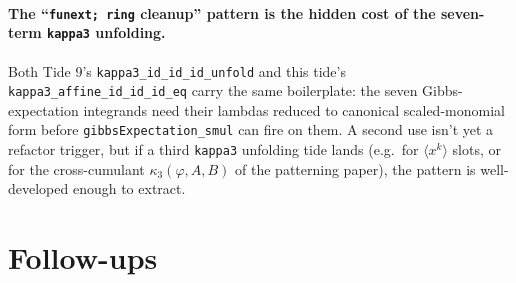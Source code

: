 \documentclass[11pt]{article}
\begin{document}
\paragraph{The ``\texttt{funext;\,ring} cleanup'' pattern is the
hidden cost of the seven-term \texttt{kappa3} unfolding.} Both Tide 9's
\texttt{kappa3\_id\_id\_id\_unfold} and this tide's
\texttt{kappa3\_affine\_id\_id\_id\_eq} carry the same boilerplate:
the seven Gibbs-expectation integrands need their lambdas reduced to
canonical scaled-monomial form before \texttt{gibbsExpectation\_smul}
can fire on them. A second use isn't yet a refactor trigger, but if a
third \texttt{kappa3} unfolding tide lands (e.g.\ for $\langle x^k \rangle$
slots, or for the cross-cumulant $\kappa_3(\varphi, A, B)$ of the
patterning paper), the pattern is well-developed enough to extract.

\section{Follow-ups}
\end{document}
